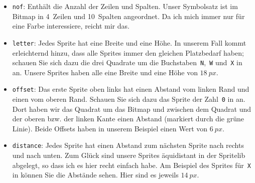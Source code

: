 \begin{itemize}
    \item \texttt{nof}: Enthält die Anzahl der Zeilen und Spalten. Unser Symbolsatz ist im Bitmap in 4~Zeilen und 10~Spalten angeordnet. Da ich mich immer nur für eine Farbe interessiere, reicht mir das.

    \item \texttt{letter}: Jedes Sprite hat eine Breite und eine Höhe. In unserem Fall kommt erleichternd hinzu, dass alle Sprites immer den gleichen Platzbedarf haben; schauen Sie sich dazu die drei Quadrate um die Buchstaben~\texttt{N},~\texttt{W} und~\texttt{X} in  an. Unsere Sprites haben alle eine Breite und eine Höhe von $18~px$.

    \item \texttt{offset}: Das erste Sprite oben links hat einen Abstand vom linken Rand und einen vom oberen Rand. Schauen Sie sich dazu das Sprite der Zahl~\texttt{0} in  an. Dort haben wir das Quadrat um das Bitmap und zwischen dem Quadrat und der oberen bzw. der linken Kante einen Abstand (markiert durch die grüne Linie). Beide Offsets haben in unserem Beispiel einen Wert von $6~px$.

    \item \texttt{distance}: Jedes Sprite hat einen Abstand zum nächsten Sprite nach rechts und nach unten. Zum Glück sind unsere Sprites äquidistant in der Spritelib abgelegt, so dass ich es hier recht einfach habe. Am Beispiel des Sprites für~\texttt{X} in  können Sie die Abstände sehen. Hier sind es jeweils $14~px$.
\end{itemize}


